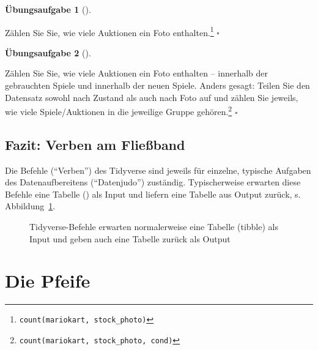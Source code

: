 \documentclass[
  letterpaper,
]{scrbook}
\theoremstyle{definition}
\theoremstyle{definition}
\theoremstyle{definition}
\newtheorem{exercise}{Übungsaufgabe}[chapter]
\theoremstyle{remark}
\begin{document}
\begin{exercise}[]\protect\hypertarget{exr-count}{}\label{exr-count}

Zählen Sie Sie, wie viele Auktionen ein Foto enthalten.\footnote{\texttt{count(mariokart,\ stock\_photo)}}
\(\square\)

\end{exercise}

\begin{exercise}[]\protect\hypertarget{exr-count2}{}\label{exr-count2}

Zählen Sie Sie, wie viele Auktionen ein Foto enthalten -- innerhalb der
gebrauchten Spiele und innerhalb der neuen Spiele. Anders gesagt: Teilen
Sie den Datensatz sowohl nach Zustand als auch nach Foto auf und zählen
Sie jeweils, wie viele Spiele/Auktionen in die jeweilige Gruppe
gehören.\footnote{\texttt{count(mariokart,\ stock\_photo,\ cond)}}
\(\square\)

\end{exercise}

\subsection{Fazit: Verben am
Fließband}\label{fazit-verben-am-flieuxdfband}

Die Befehle (``Verben'') des Tidyverse sind jeweils für einzelne,
typische Aufgaben des Datenaufbereitens (``Datenjudo'') zuständig.
Typischerweise erwarten diese Befehle eine Tabelle () als
Input und liefern eine Tabelle aus Output zurück, s.
Abbildung~\ref{fig-tbl-in-out}.

\begin{figure}


\caption{\label{fig-tbl-in-out}Tidyverse-Befehle erwarten normalerweise
eine Tabelle (tibble) als Input und geben auch eine Tabelle zurück als
Output}

\end{figure}%

\section{Die Pfeife}\label{sec-pipe}
\end{document}

